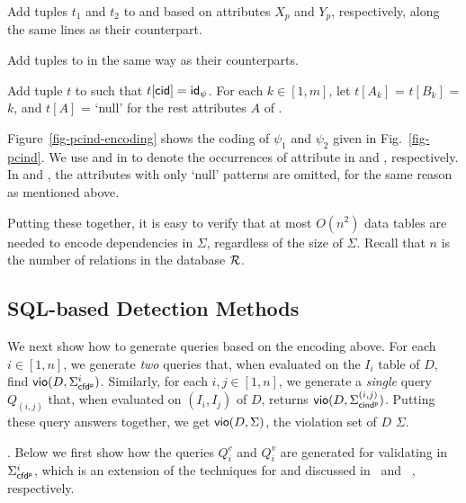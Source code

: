 \vspace{-0.5ex}\bi
\item Add tuples $t_1$ and $t_2$ to  and 
based on attributes $X_p$ and $Y_p$, respectively, along the
same lines as their \pCFD counterpart.
\item Add tuples to \Enc{\ne} in the same way as their
\pCFD counterparts.
\item Add tuple $t$ to \Enc{} such that $t[\protect\mathsf{cid}] = {\mathsf{id}}_\psi$.
For each $k\in[1, m]$,  let $t[A_k]$ = $t[B_k]$ = $k$, and $t[A]$ =
`null' for the rest attributes $A$ of \Enc{}. \ei \vspace{-1ex}




\begin{example} \label{exa-enc-pfind}
Figure~\ref{fig-pcind-encoding} shows the coding of \pCINDs $\psi_1$
and $\psi_2$ given in Fig.~\ref{fig-pcind}. We use  and
 in \Enc{} to denote the occurrences of attribute
 in  and , respectively. In
 and , the attributes with only `null' patterns are
omitted, for the same reason as \pCFDs mentioned above.
\end{example}

Putting these together, it is easy to verify that at most $O(n^2)$
data tables are needed to encode dependencies in $\Sigma$,
regardless of the size of $\Sigma$. Recall that $n$ is the number of
relations in the database $\R$.


\subsection{SQL-based Detection Methods}

We next show how to generate \SQL queries based on the encoding
above. For each $i\in [1, n]$, we generate {\em two} \SQL queries
that, when evaluated on the $I_i$ table of $D$, find ${\mathsf{vio}}(D,
\Sigma_{{\mathsf{cfd^p}}}^i)$. Similarly, for each $i,j \in [1, n]$, we generate a {\em
single} \SQL query $Q_{(i,j)}$ that, when evaluated on $(I_i, I_j)$
of $D$, returns ${\mathsf{vio}}(D, \Sigma_{{\mathsf{cind^p}}}^{(i,j)})$. Putting these query
answers together, we get ${\mathsf{vio}}(D, \Sigma)$, the violation set of
$D$ \wrt $\Sigma$.



.
Below we first show how the \SQL queries $Q_{i}^c$ and $Q_{i}^v$ are generated for
validating \pCFDs in $\Sigma_{{\mathsf{cfd^p}}}^i$, which is an extension of the
\SQL techniques for \CFDs and \eCFDs discussed in~\cite{CFDs} and ~\cite{icde08}, respectively.


